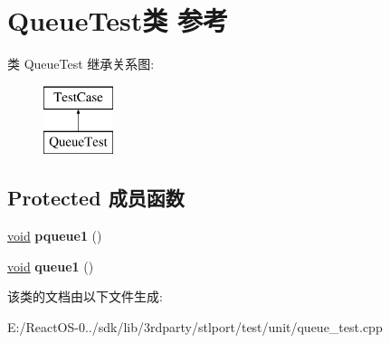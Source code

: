 \hypertarget{class_queue_test}{}\section{Queue\+Test类 参考}
\label{class_queue_test}
类 Queue\+Test 继承关系图\+:\begin{figure}[H]
\begin{center}
\leavevmode
\includegraphics[height=2.000000cm]{class_queue_test}
\end{center}
\end{figure}
\subsection*{Protected 成员函数}
\begin{DoxyCompactItemize}
\item 
\mbox{\label{class_queue_test_a3c4cbe63b44625d0ce067174df5adab2}} 
\hyperlink{interfacevoid}{void} {\bfseries pqueue1} ()
\item 
\mbox{\label{class_queue_test_a1655a55a590aec18989a4be3337c4b77}} 
\hyperlink{interfacevoid}{void} {\bfseries queue1} ()
\end{DoxyCompactItemize}


该类的文档由以下文件生成\+:\begin{DoxyCompactItemize}
\item 
E\+:/\+React\+O\+S-\/0../sdk/lib/3rdparty/stlport/test/unit/queue\+\_\+test.\+cpp\end{DoxyCompactItemize}
